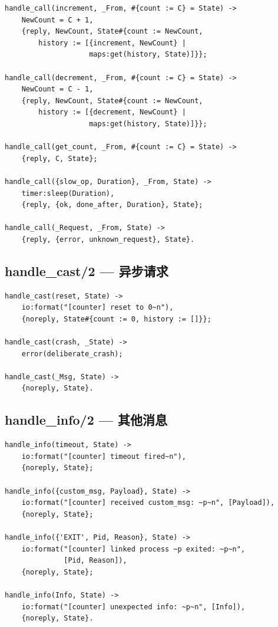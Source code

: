 \documentclass[a4paper,11pt]{article}
\begin{document}
\begin{lstlisting}[style=erlangstyle, caption={handle\_call/3 --- 处理同步请求}]
handle_call(increment, _From, #{count := C} = State) ->
    NewCount = C + 1,
    {reply, NewCount, State#{count := NewCount,
        history := [{increment, NewCount} |
                    maps:get(history, State)]}};

handle_call(decrement, _From, #{count := C} = State) ->
    NewCount = C - 1,
    {reply, NewCount, State#{count := NewCount,
        history := [{decrement, NewCount} |
                    maps:get(history, State)]}};

handle_call(get_count, _From, #{count := C} = State) ->
    {reply, C, State};

handle_call({slow_op, Duration}, _From, State) ->
    timer:sleep(Duration),
    {reply, {ok, done_after, Duration}, State};

handle_call(_Request, _From, State) ->
    {reply, {error, unknown_request}, State}.
\end{lstlisting}

\subsection{handle\_cast/2 --- 异步请求}

\begin{lstlisting}[style=erlangstyle, caption={handle\_cast/2 --- 处理异步请求}]
handle_cast(reset, State) ->
    io:format("[counter] reset to 0~n"),
    {noreply, State#{count := 0, history := []}};

handle_cast(crash, _State) ->
    error(deliberate_crash);

handle_cast(_Msg, State) ->
    {noreply, State}.
\end{lstlisting}

\subsection{handle\_info/2 --- 其他消息}

\begin{lstlisting}[style=erlangstyle, caption={handle\_info/2 --- 处理非 call/cast 消息}]
handle_info(timeout, State) ->
    io:format("[counter] timeout fired~n"),
    {noreply, State};

handle_info({custom_msg, Payload}, State) ->
    io:format("[counter] received custom_msg: ~p~n", [Payload]),
    {noreply, State};

handle_info({'EXIT', Pid, Reason}, State) ->
    io:format("[counter] linked process ~p exited: ~p~n",
              [Pid, Reason]),
    {noreply, State};

handle_info(Info, State) ->
    io:format("[counter] unexpected info: ~p~n", [Info]),
    {noreply, State}.
\end{lstlisting}
\end{document}
